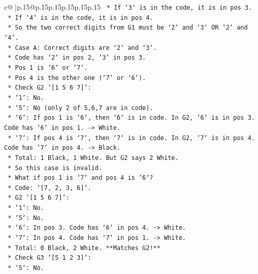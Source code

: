 \documentclass{article}
\begin{document}
{\begin{supertabular}{c@{$\;$}|p{.15\linewidth}@{}p{.15\linewidth}p{.15\linewidth}p{.15\linewidth}p{.15\linewidth}p{.15\linewidth}}
{{{\texttt{        *   If `3` is in the code, it is in pos 3.} \\
\texttt{        *   If `4` is in the code, it is in pos 4.} \\
\texttt{        *   So the two correct digits from G1 must be `2` and `3` OR `2` and `4`.} \\
\texttt{        *   Case A: Correct digits are `2` and `3`.} \\
\texttt{            *   Code has `2` in pos 2, `3` in pos 3.} \\
\texttt{            *   Pos 1 is `6` or `7`.} \\
\texttt{            *   Pos 4 is the other one (`7` or `6`).} \\
\texttt{            *   Check G2 `{[}1 5 6 7{]}`:} \\
\texttt{                *   `1`: No.} \\
\texttt{                *   `5`: No (only 2 of 5,6,7 are in code).} \\
\texttt{                *   `6`: If pos 1 is `6`, then `6` is in code. In G2, `6` is in pos 3. Code has `6` in pos 1. {-}> White.} \\
\texttt{                *   `7`: If pos 4 is `7`, then `7` is in code. In G2, `7` is in pos 4. Code has `7` in pos 4. {-}> Black.} \\
\texttt{                *   Total: 1 Black, 1 White. But G2 says 2 White.} \\
\texttt{                *   So this case is invalid.} \\
\texttt{            *   What if pos 1 is `7` and pos 4 is `6`?} \\
\texttt{                *   Code: `{[}7, 2, 3, 6{]}`.} \\
\texttt{                *   G2 `{[}1 5 6 7{]}`:} \\
\texttt{                    *   `1`: No.} \\
\texttt{                    *   `5`: No.} \\
\texttt{                    *   `6`: In pos 3. Code has `6` in pos 4. {-}> White.} \\
\texttt{                    *   `7`: In pos 4. Code has `7` in pos 1. {-}> White.} \\
\texttt{                    *   Total: 0 Black, 2 White. **Matches G2!**} \\
\texttt{                *   Check G3 `{[}5 1 2 3{]}`:} \\
\texttt{                    *   `5`: No.} \\
}}}
\end{supertabular}}
\end{document}

